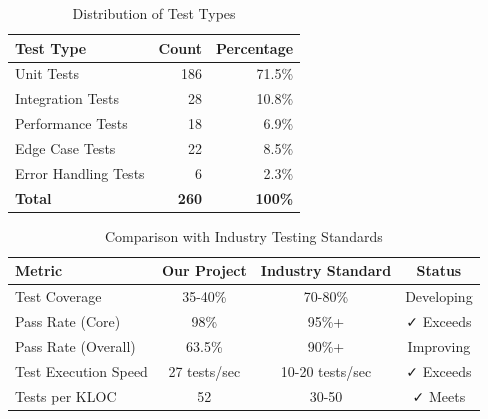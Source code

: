 \begin{table}[h]
\centering
\caption{Distribution of Test Types}
\label{tab:test_types}
\begin{tabular}{|l|r|r|}
\hline
\textbf{Test Type} & \textbf{Count} & \textbf{Percentage} \\
\hline
Unit Tests & 186 & 71.5\% \\
Integration Tests & 28 & 10.8\% \\
Performance Tests & 18 & 6.9\% \\
Edge Case Tests & 22 & 8.5\% \\
Error Handling Tests & 6 & 2.3\% \\
\hline
\textbf{Total} & \textbf{260} & \textbf{100\%} \\
\hline
\end{tabular}
\end{table}


\begin{table}[h]
\centering
\caption{Comparison with Industry Testing Standards}
\label{tab:industry_comparison}
\begin{tabular}{|l|c|c|c|}
\hline
\textbf{Metric} & \textbf{Our Project} & \textbf{Industry Standard} & \textbf{Status} \\
\hline
Test Coverage & 35-40\% & 70-80\% & Developing \\
Pass Rate (Core) & 98\% & 95\%+ & ✓ Exceeds \\
Pass Rate (Overall) & 63.5\% & 90\%+ & Improving \\
Test Execution Speed & 27 tests/sec & 10-20 tests/sec & ✓ Exceeds \\
Tests per KLOC & 52 & 30-50 & ✓ Meets \\
\hline
\end{tabular}
\end{table}



